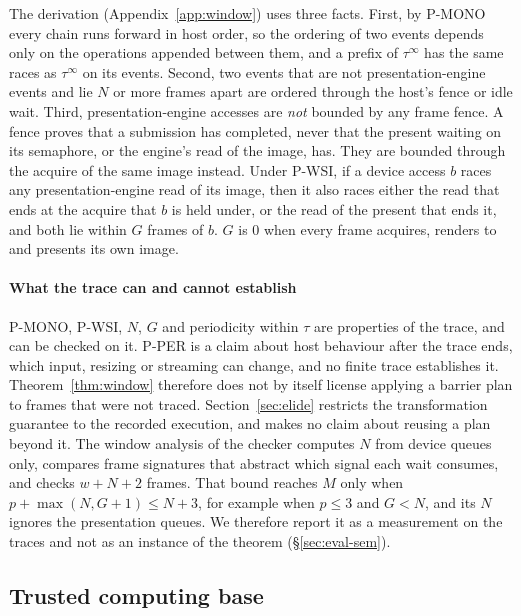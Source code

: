 The derivation (Appendix~\ref{app:window}) uses three facts. First, by P-MONO every chain runs forward in host order,
so the ordering of two events depends only on the operations appended between them, and a prefix of $\tau^\infty$ has
the same races as $\tau^\infty$ on its events. Second, two events that are not presentation-engine events and lie $N$
or more frames apart are ordered through the host's fence or idle wait. Third, presentation-engine accesses are
\emph{not} bounded by any frame fence. A fence proves that a submission has completed, never that the present waiting
on its semaphore, or the engine's read of the image, has. They are bounded through the acquire of the same image
instead. Under P-WSI, if a device access $b$ races any presentation-engine read of its image, then it also races
either the read that ends at the acquire that $b$ is held under, or the read of the present that ends it, and both lie
within $G$ frames of $b$. $G$ is 0 when every frame acquires, renders to and presents its own image.

\paragraph{What the trace can and cannot establish}
P-MONO, P-WSI, $N$, $G$ and periodicity within $\tau$ are properties of the trace, and can be checked on it.
P-PER is a claim about host behaviour after the trace ends, which input, resizing or streaming can change, and no
finite trace establishes it. Theorem~\ref{thm:window} therefore does not by itself license applying a barrier plan to
frames that were not traced. Section~\ref{sec:elide} restricts the transformation guarantee to the recorded execution,
and makes no claim about reusing a plan beyond it. The window analysis of the checker
computes $N$ from device queues only, compares frame signatures that abstract which signal each wait consumes, and
checks $w + N + 2$ frames. That bound reaches $M$ only when $p + \max(N, G+1) \le N + 3$, for example when $p \le 3$
and $G < N$, and its $N$ ignores the presentation queues. We therefore report it as a measurement on the traces and
not as an instance of the theorem (\S\ref{sec:eval-sem}).

\subsection{Trusted computing base}
\label{sec:tcb}

